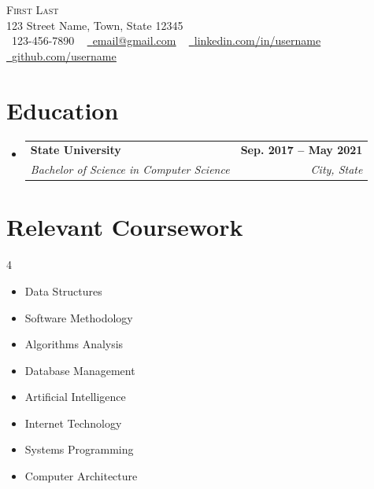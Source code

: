 \documentclass[letterpaper,11pt]{article}
\makeatletter
\newcommand{\resumeSubheading}[4]{
  \vspace{-2pt}\item
    \begin{tabular*}{1.0\textwidth}[t]{l@{\extracolsep{\fill}}r}
      \textbf{#1} & \textbf{\small #2} \\
      \textit{\small#3} & \textit{\small #4} \\
    \end{tabular*}\vspace{-7pt}
}
\newcommand{\resumeSubHeadingListStart}{\begin{itemize}[leftmargin=0.0in, label={}]}
\newcommand{\resumeSubHeadingListEnd}{\end{itemize}}
\makeatother
\begin{document}

\begin{center}
    {\Huge \scshape First Last} \\ \vspace{1pt}
    123 Street Name, Town, State 12345 \\ \vspace{1pt}
    \small \raisebox{-0.1\height}\faPhone\ 123-456-7890 ~ \href{mailto:x@gmail.com}{\raisebox{-0.2\height}\faEnvelope\  \underline{email@gmail.com}} ~ 
    \href{https://linkedin.com/in//}{\raisebox{-0.2\height}\faLinkedin\ \underline{linkedin.com/in/username}}  ~
    \href{https://github.com/}{\raisebox{-0.2\height}\faGithub\ \underline{github.com/username}}
    \vspace{-8pt}
\end{center}


\section{Education}
  \resumeSubHeadingListStart
    \resumeSubheading
      {State University}{Sep. 2017 -- May 2021}
      {Bachelor of Science in Computer Science}{City, State}
  \resumeSubHeadingListEnd

\section{Relevant Coursework}
        \begin{multicols}{4}
            \begin{itemize}[itemsep=-5pt, parsep=3pt]
                \item\small Data Structures
                \item Software Methodology
                \item Algorithms Analysis
                \item Database Management
                \item Artificial Intelligence
                \item Internet Technology
                \item Systems Programming
                \item Computer Architecture
            \end{itemize}
        \end{multicols}
        \vspace*{2.0\multicolsep}
\end{document}
